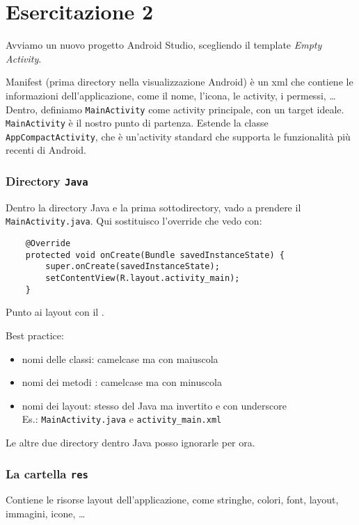 
\chapter{Esercitazione 2}
\par Avviamo un nuovo progetto Android Studio, scegliendo il template \textit{Empty Activity}.
\par Manifest (prima directory nella visualizzazione Android) è un xml che contiene le informazioni dell'applicazione, come il nome, l'icona, le activity, i permessi, \dots Dentro, definiamo \texttt{MainActivity} come activity principale, con un target ideale. \texttt{MainActivity} è il nostro punto di partenza. Estende la classe \texttt{AppCompactActivity}, che è un'activity standard che supporta le funzionalità più recenti di Android.

\subsection{Directory \texttt{Java}}
\par Dentro la directory Java e la prima sottodirectory, vado a prendere il \texttt{MainActivity.java}. Qui sostituisco l'override che vedo con:
\begin{verbatim}
    @Override
    protected void onCreate(Bundle savedInstanceState) {
        super.onCreate(savedInstanceState);
        setContentView(R.layout.activity_main);
    }
\end{verbatim}
\par Punto ai layout con il .
\par Best practice:
\begin{itemize}
    \item nomi delle classi: camelcase ma con maiuscola
    \item nomi dei metodi : camelcase ma con minuscola
    \item nomi dei layout: stesso del Java ma invertito e con underscore\\
    Es.: \texttt{MainActivity.java} e \texttt{activity\_main.xml}
\end{itemize}
\par Le altre due directory dentro Java posso ignorarle per ora.

\subsection{La cartella \texttt{res}}
\par Contiene le risorse layout dell'applicazione, come stringhe, colori, font, layout, immagini, icone, \dots

